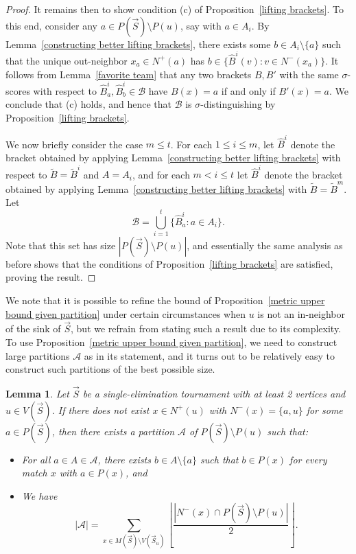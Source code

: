\documentclass[12pt,letterpaper]{article}
\newtheorem{lem}[thm]{Lemma}
\theoremstyle{definition}
\newcommand{\sig}{\sigma}
\renewcommand{\1}{\mathbbm{1}}
\newcommand{\sm}{\setminus}
\renewcommand{\c}[1]{\mathcal{#1}}
\newcommand{\tour}{\vec{S}}
\begin{document}
\begin{proof}
	It remains then to show condition (c) of Proposition~\ref{lifting brackets}.  To this end, consider any $a\in P(\tour)\sm P(u)$, say with $a\in A_i$.  By Lemma~\ref{constructing better lifting brackets}, there exists some $b\in A_i\sm \{a\}$ such that the unique out-neighbor $x_a\in N^+(a)$ has $b\in \{\widehat{B}^i(v):v\in N^-(x_a)\}$.  It follows from Lemma~\ref{favorite team} that any two brackets $B,B'$ with the same $\sig$-scores with respect to $\widehat{B}^i_a,\widehat{B}^i_b\in \c{B}$ have $B(x)=a$ if and only if $B'(x)=a$.  We conclude that (c) holds, and hence that $\c{B}$ is $\sig$-distinguishing by Proposition~\ref{lifting brackets}.
	
	We now briefly consider the case  $m\le t$.  For each $1\le i \le m$, let $\widehat{B}^i$ denote the bracket obtained by applying Lemma~\ref{constructing better lifting brackets} with respect to $\widetilde{B}=\widetilde{B}^{i}$ and $A=A_i$, and for each $m<i\le t$ let $\widehat{B}^i$ denote the bracket obtained by applying Lemma~\ref{constructing better lifting brackets} with $\widetilde{B}=\widetilde{B}^m$.  Let
	\[\c{B}=\bigcup_{i=1}^t\{\widehat{B}_a^{i}:a\in A_i\}.\]
	Note that this set has size $|P(\tour)\sm P(u)|$, and essentially the same analysis as before shows that the conditions of Proposition~\ref{lifting brackets} are satisfied, proving the result.	
\end{proof}
We note that it is possible to refine the bound of Proposition~\ref{metric upper bound given partition} under certain circumstances when $u$ is not an in-neighbor of the sink of $\tour$, but we refrain from stating such a result due to its complexity. To use Proposition~\ref{metric upper bound given partition}, we need to construct large partitions $\c{A}$ as in its statement, and it turns out to be relatively easy to construct such partitions of the best possible size.
\begin{lem}\label{partitions exist}
	Let $\tour$ be a single-elimination tournament with at least 2 vertices and $u\in V(\tour)$.  If there does not exist $x\in N^+(u)$ with $N^-(x)=\{a,u\}$ for some $a\in P(\tour)$, then there exists a partition $\c{A}$ of $P(\tour)\sm P(u)$ such that: 
	\begin{itemize}
		\item[(i)] For all $a\in A\in \c{A}$, there exists $b\in A\sm \{a\}$ such that $b\in P(x)$ for every match $x$ with $a\in P(x)$, and
		\item[(ii)] We have \[|\c{A}|=\sum_{x\in M(\tour)\sm V(\tour_u)} \left\lfloor \frac{|N^-(x)\cap P(\tour)\sm P(u)|}{2} \right\rfloor.\]
	\end{itemize}
\end{lem}
\end{document}
